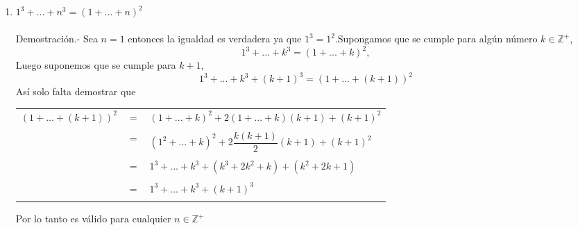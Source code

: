 \begin{enumerate}
\begin{enumerate}[\bfseries (i)]
\item $1^3 + ... + n^3 = (1+...+n)^2$\\\\
Demostración.- \; Sea $n=1$ entonces la igualdad es verdadera ya que $1^3 = 1^2$.Supongamos que se cumple para algún número $k \in \mathbb{Z}^+$,
$$1^3 + ... + k^3 = (1+...+k)^2,$$ Luego suponemos que se cumple para $k+1$, $$1^3 + ... + k^3 + (k+1)^3 = (1+...+(k+1))^2$$
Así solo falta demostrar que 
\begin{center}
\begin{tabular}{rcl}
$(1+...+(k+1))^2$&$=$&$(1+...+k)^2 + 2(1+...+k)(k+1) + (k+1)^2$\\\\
&$=$&$(1^2 + ... + k)^2 + 2\dfrac{k(k+1)}{2} (k+1) + (k+1)^2$\\\\
&$=$&$1^3 + ... + k^3 + (k^3 + 2k^2 + k) + (k^2 + 2k +1)$\\\\
&$=$&$1^3 + ... + k^3 + (k+1)^3$\\\\
\end{tabular}
\end{center}
Por lo tanto es válido para cualquier $n \in \mathbb{Z}^+$\\\\
\end{enumerate}
\end{enumerate}